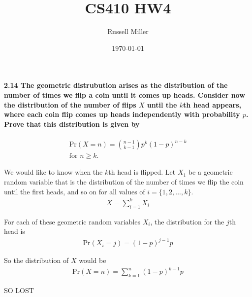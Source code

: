 \documentclass{article}
\title{CS410 HW4}
\author{Russell Miller}
\date{\today}
\begin{document}
\maketitle


\paragraph{2.14 The geometric distrubution arises as the distribution of the 
number of times we flip a coin until it comes up heads. Consider now the 
distribution of the number of flips $X$ until the $k$th head appears, where 
each coin flip comes up heads independently with probability $p$. Prove that 
this distribution is given by}
\begin{eqnarray*}
\mbox{Pr}(X=n)={n-1 \choose k-1}p^k(1-p)^{n-k}\\
\mbox{for } n \geq k.
\end{eqnarray*}

We would like to know when the $k$th head is flipped. Let $X_1$ be a geometric 
random variable that is the distribution of the number of times we flip the coin
until the first heads, and so on for all values of $i=\{1,2,...,k\}$.
\begin{eqnarray*}
X = \sum\limits_{i=1}^k X_i
\end{eqnarray*}

For each of these geometric random variables $X_i$, the distribution for the 
$j$th head is
\begin{eqnarray*}
\mbox{Pr}(X_i=j) = (1-p)^{j-1}p 
\end{eqnarray*}

So the distribution of $X$ would be
\begin{eqnarray*}
\mbox{Pr}(X=n)=\sum\limits_{k=1}^n (1-p)^{k-1}p
\end{eqnarray*}

\Large SO LOST
\end{document}
